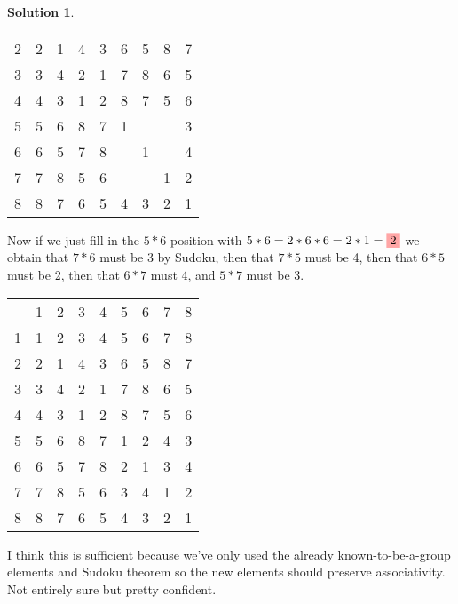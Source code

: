 \documentclass[10pt]{article}
\theoremstyle{definition}
\newtheorem{soln}{Solution}
\begin{document}
\begin{soln}
\begin{center}
\begin{tabular}{c | c c c c c c c c}
      2 & 2 & 1 & 4 & 3 & 6                           & 5                          & 8                            & 7 \\
      3 & 3 & 4 & 2 & 1 & 7                           & 8                          & 6                            & 5 \\
      4 & 4 & 3 & 1 & 2 & 8                           & 7                          & 5                            & 6 \\
      5 & 5 & 6 & 8 & 7 & 1                           &                            &                              & 3 \\
      6 & 6 & 5 & 7 & 8 &                             & 1                          &                              & 4 \\
      7 & 7 & 8 & 5 & 6 &                             &                            & 1                            & 2 \\
      8 & 8 & 7 & 6 & 5 & \colorbox{blue!20!white}{4} & \colorbox{red!35!white}{3} & \colorbox{green!50!white}{2} & 1
    \end{tabular}
  \end{center}
  Now if we just fill in the $5*6$ position with $5*6=2*6*6=2*1=\colorbox{red!35!white}{2}$ we obtain
  that $7*6$ must be 3 by Sudoku, then that $7*5$ must be 4, then that $6*5$ must be 2, then that
  $6*7$ must 4, and $5*7$ must be 3.
  \begin{center}
    \begin{tabular}{c | c c c c c c c c}
      ~ & 1 & 2 & 3 & 4 & 5                          & 6 & 7 & 8 \\
      \cline{1-9}
      1 & 1 & 2 & 3 & 4 & 5                          & 6 & 7 & 8 \\
      2 & 2 & 1 & 4 & 3 & 6                          & 5 & 8 & 7 \\
      3 & 3 & 4 & 2 & 1 & 7                          & 8 & 6 & 5 \\
      4 & 4 & 3 & 1 & 2 & 8                          & 7 & 5 & 6 \\
      5 & 5 & 6 & 8 & 7 & 1                          & 2 & 4 & 3 \\
      6 & 6 & 5 & 7 & 8 & \colorbox{red!35!white}{2} & 1 & 3 & 4 \\
      7 & 7 & 8 & 5 & 6 & 3                          & 4 & 1 & 2 \\
      8 & 8 & 7 & 6 & 5 & 4                          & 3 & 2 & 1
    \end{tabular}
  \end{center}
  I think this is sufficient because we've only used the already known-to-be-a-group elements and Sudoku theorem so the new elements
  should preserve associativity. Not entirely sure but pretty confident.
\end{soln}
\end{document}
